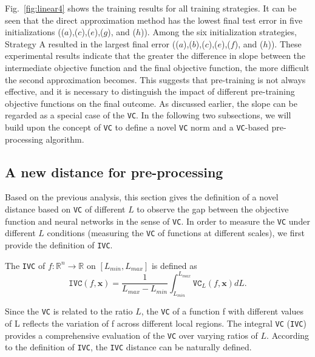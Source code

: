\documentclass[final]{siamart220329}
\newtheorem{theoretical insights}{Theoretical insights}
\newtheorem{practical takeaway}{Practical takeaway}
\begin{document}
{{{{Fig.~\ref{fig:linear4} shows the training results for all training strategies. It can be seen that the direct approximation method has the lowest final test error in five initializations (($a$),($c$),($e$),($g$), and ($h$)). Among the six initialization strategies, Strategy A resulted in the largest final error (($a$),($b$),($c$),($e$),($f$), and ($h$)). These experimental results indicate that the greater the difference in slope between the intermediate objective function and the final objective function, the more difficult the second approximation becomes.
This suggests that pre-training is not always effective, and it is necessary to distinguish the impact of different pre-training objective functions on the final outcome. As discussed earlier, the slope can be regarded as a special case of the \texttt{VC}. In the following two subsections, we will build upon the concept of \texttt{VC} to define a novel \texttt{VC} norm and a \texttt{VC}-based pre-processing algorithm.

 

\subsection{A new distance for pre-processing}


Based on the previous analysis, this section gives the definition of a novel distance based on \texttt{VC} of different $L$ to observe the gap between the objective function and neural networks in the sense of \texttt{VC}.  
In order to measure the \texttt{VC} under different $L$ conditions (measuring the \texttt{VC} of functions at different scales), we first provide the definition of \texttt{IVC}.


\begin{definition}\label{IVC} 
{\color{black} 
The \texttt{IVC} of $f: \mathbb{R}^n \rightarrow\mathbb{R}$ on $[L_{min},L_{max}]$ is defined as 
\[\texttt{IVC}(f,{\bm x}) = \frac{1}{L_{max}-L_{min}}\int_{L_{min}}^{L_{max}} \texttt{VC}_{L}(f,{\bm x})dL. 
\]}
\end{definition}

Since the \texttt{VC} is related to the ratio $L$, the \texttt{VC} of a function f with different values of L reflects the variation of f across different local regions. The integral \texttt{VC} (\texttt{IVC}) provides a comprehensive evaluation of the \texttt{VC} over varying ratios of $L$. According to the definition of \texttt{IVC}, the \texttt{IVC} distance can be naturally defined.

}}}}
\end{document}
